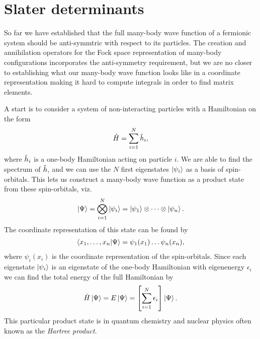     \section{Slater determinants}
        So far we have established that the full many-body wave function of a
        fermionic system should be anti-symmtric with respect to its particles.
        The creation and annihilation operators for the Fock space
        representation of many-body configurations incorporates the
        anti-symmetry requirement, but we are no closer to establishing what our
        many-body wave function looks like in a coordinate representation making
        it hard to compute integrals in order to find matrix elements.

        A start is to consider a system of non-interacting particles with a
        Hamiltonian on the form
        \begin{align}
            \hat{H} = \sum_{i = 1}^{N} \hat{h}_i,
        \end{align}
        where $\hat{h}_i$ is a one-body Hamiltonian acting on particle $i$. We
        are able to find the spectrum of $\hat{h}$, and we can use the $N$
        first eigenstates $\ket{\psi_i}$ as a basis of spin-orbitals.
        This lets us construct a many-body wave function as a product state from
        these spin-orbitals, viz.
        \begin{align}
            \ket{\Psi}
            = \bigotimes_{i = 1}^{N}\ket{\psi_i}
            = \ket{\psi_1}\otimes\dots\otimes\ket{\psi_n}.
        \end{align}
        The coordinate representation of this state can be found by
        \begin{align}
            \braket{x_1, \dots, x_n}{\Psi}
            = \psi_1(x_1)\dots\psi_n(x_n),
        \end{align}
        where $\psi_i(x_i)$ is the coordinate representation of the
        spin-orbitals.
        Since each eigenstate $\ket{\psi_i}$ is an eigenstate of the one-body
        Hamiltonian with eigenenergy $\epsilon_i$ we can find the total energy
        of the full Hamiltonian by
        \begin{align}
            \hat{H}\ket{\Psi}
            = E\ket{\Psi}
            = \left[ 
                \sum_{i = 1}^{N}
                \epsilon_i
             \right]\ket{\Psi}.
        \end{align}
        This particular product state is in quantum chemistry and nuclear
        physics often known as the \emph{Hartree product}.
